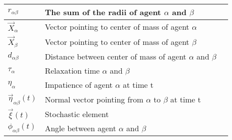 \begin{center}
\begin{tabular}{lll}
\hline
$r_{\alpha \beta}$ & The sum of the radii of agent $\alpha$ and $\beta$ & \\
\hline
$\vec{X}_{\alpha}$ & Vector pointing to center of mass of agent $\alpha$ & \\
\hline
$\vec{X}_{\beta}$ & Vector pointing to center of mass of agent $\beta$ & \\
\hline
$d_{\alpha \beta}$ & Distance between center of mass of agent $\alpha$ and $\beta$ & \\
\hline
$\tau_{\alpha}$ & Relaxation time $\alpha$ and $\beta$ & \\
\hline
$\eta_{\alpha}$ & Impatience of agent $\alpha$ at time t & \\
\hline
$\vec{\eta}_{\alpha \beta}\left( t \right)$ & Normal vector pointing from $\alpha$ to $\beta$ at time t & \\
\hline
$\vec{\xi}\left( t \right)$ & Stochastic element & \\
\hline
$\phi_{\alpha \beta} \left( t \right)$ & Angle between agent $\alpha$ and $\beta$ & \\
\hline

\end{tabular}
\end{center}

\clearpage
